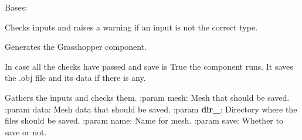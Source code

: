 \documentclass[letterpaper,10pt,english]{sphinxmanual}
\begin{document}

\begin{fulllineitems}
\label{\detokenize{geometry:livestock.components.geometry.SaveMesh}}
Bases: {\hyperref[\detokenize{superclass:livestock.components.component.GHComponent}]{}}

\begin{fulllineitems}
\label{\detokenize{geometry:livestock.components.geometry.SaveMesh.check_inputs}}
Checks inputs and raises a warning if an input is not the correct type.

\end{fulllineitems}


\begin{fulllineitems}
\label{\detokenize{geometry:livestock.components.geometry.SaveMesh.config}}
Generates the Grasshopper component.

\end{fulllineitems}


\begin{fulllineitems}
\label{\detokenize{geometry:livestock.components.geometry.SaveMesh.run}}
In case all the checks have passed and save is True the component runs.
It saves the .obj file and its data if there is any.

\end{fulllineitems}


\begin{fulllineitems}
\label{\detokenize{geometry:livestock.components.geometry.SaveMesh.run_checks}}
Gathers the inputs and checks them.
:param mesh: Mesh that should be saved.
:param data: Mesh data that should be saved.
:param {\color{red}\bfseries{}dir\_}: Directory where the files should be saved.
:param name: Name for mesh.
:param save: Whether to save or not.

\end{fulllineitems}


\end{fulllineitems}
\end{document}
